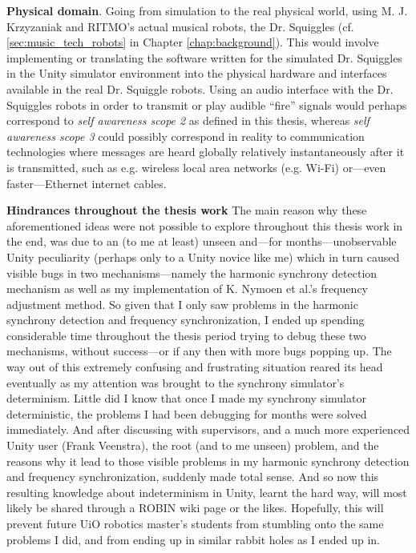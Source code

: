 \textbf{Physical domain}. Going from simulation to the real physical world, using M. J. Krzyzaniak and RITMO's  actual musical robots, the Dr. Squiggles (cf. \ref{sec:music_tech_robots} in Chapter \ref{chap:background}). This would involve implementing or translating the software written for the simulated Dr. Squiggles in the Unity simulator environment into the physical hardware and interfaces available in the real Dr. Squiggle robots. Using an audio interface with the Dr. Squiggles robots in order to transmit or play audible ``fire'' signals would perhaps correspond to \textit{self awareness scope 2} as defined in this thesis, whereas \textit{self awareness scope 3} could possibly correspond in reality to communication technologies where messages are heard globally relatively instantaneously after it is transmitted, such as e.g. wireless local area networks (e.g. Wi-Fi) or—even faster—Ethernet internet cables.

\textbf{Hindrances throughout the thesis work}
The main reason why these aforementioned ideas were not possible to explore throughout this thesis work in the end, was due to an (to me at least) unseen and—for months—unobservable Unity peculiarity (perhaps only to a Unity novice like me) which in turn caused visible bugs in two mechanisms—namely the harmonic synchrony detection mechanism as well as my implementation of K. Nymoen et al.'s frequency adjustment method. So given that I only saw problems in the harmonic synchrony detection and frequency synchronization, I ended up spending considerable time throughout the thesis period trying to debug these two mechanisms, without success—or if any then with more bugs popping up. The way out of this extremely confusing and frustrating situation reared its head eventually as my attention was brought to the synchrony simulator's determinism. Little did I know that once I made my synchrony simulator deterministic, the problems I had been debugging for months were solved immediately. And after discussing with supervisors, and a much more experienced Unity user (Frank Veenstra), the root (and to me unseen) problem, and the reasons why it lead to those visible problems in my harmonic synchrony detection and frequency synchronization, suddenly made total sense. And so now this resulting knowledge about indeterminism in Unity, learnt the hard way, will most likely be shared through a ROBIN wiki page or the likes. Hopefully, this will prevent future UiO robotics master's students from stumbling onto the same problems I did, and from ending up in similar rabbit holes as I ended up in.